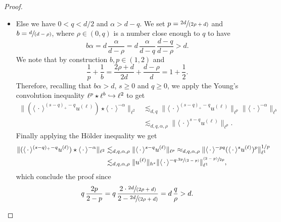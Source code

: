 \documentclass[11pt]{article}
\newcommand\hto{\mathrel{\lhook\joinrel\to}}
\newcommand{\psfrac}[2]{\sfrac{(#1)}{#2}}
\newcommand{\spfrac}[2]{\sfrac{#1}{(#2)}}
\theoremstyle{definition}
\begin{document}
\begin{proof}
\begin{itemize}
\item
Else we have $0<q<d/2$ and $\alpha > d-q$. We set $p = \spfrac{2d}{2\rho+d}$ and $b = \spfrac{d}{d -\rho}$, where $\rho \in (0,q)$ is a number close enough to $q$ to have
\[
b \alpha = d \,\frac{\alpha}{d-\rho} = d \,\frac{\alpha}{d-q}\, \frac{d-q}{d-\rho} > d.
\]
We note that by construction $b,p\in (1,2)$ and
\[
\frac1p + \frac1b =\frac{2\rho+d}{2d} + \frac{d -\rho}{d} =1+\frac12.
\]
Therefore, recalling that $b\alpha >d$, $s\geq 0$ and $q\geq 0$, we apply the Young's convolution inequality $\ell^p \star \ell^b \hto \ell^2$ to get
\begin{equation*}
\begin{split}
\| (\langle \, \cdot\,\rangle^{(s-q)_+-q} u^{(\ell)}) \star \langle \, \cdot \, \rangle^{-\alpha} \|_{\ell^2} &\lesssim_{d,q} \| \langle \, \cdot\,\rangle^{(s-q)_+-q} u^{(\ell)}\|_{\ell^p} \|\langle \, \cdot \, \rangle^{-\alpha} \|_{\ell^b} \\ &\lesssim_{d,q,\alpha,\rho} \| \langle \, \cdot\,\rangle^{s-q} u^{(\ell)}\|_{\ell^p}.
\end{split}
\end{equation*}
Finally applying the Hölder inequality we get
\begin{equation*}
\begin{split}
\| (\langle \, \cdot\,\rangle^{(s-q)_+-q} u^{(\ell)}) \star \langle \, \cdot \, \rangle^{-\alpha} \|_{\ell^2} &\lesssim_{d,q,\alpha,\rho} \| \langle \, \cdot\,\rangle^{s-q} u^{(\ell)}\|_{\ell^p} \approx_{d,q,\alpha,\rho} \| \langle \, \cdot\,\rangle^{-pq} (\langle \, \cdot\,\rangle^{s} u^{(\ell)})^p\|_{\ell^1}^{1/p} \\
&\lesssim_{d,q,\alpha,\rho} \| u^{(\ell)} \|_{h^s} \| \langle \, \cdot\,\rangle^{-q\cdot \spfrac{2p}{2-p}} \|_{\ell^1}^{\psfrac{2-p}{2p}},
\end{split}
\end{equation*}
which conclude the proof since
\[
q\, \frac{2p}{2-p} = q\, \frac{2\cdot\spfrac{2d}{2\rho+d}}{2-\spfrac{2d}{2\rho+d}} = d\, \frac{q}{\rho} > d.\qedhere
\]
\end{itemize}
\end{proof}
\end{document}
